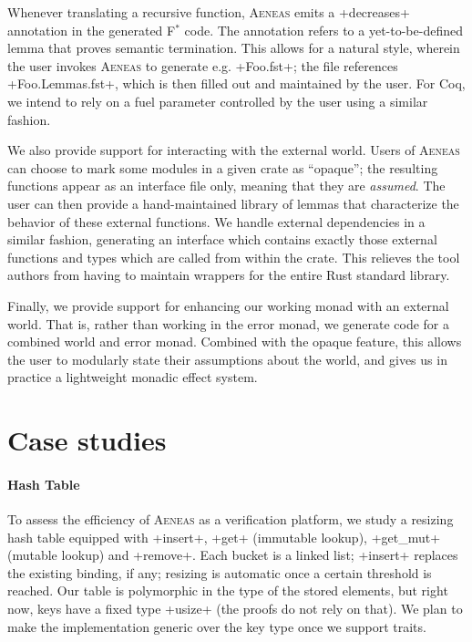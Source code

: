 \documentclass[acmsmall,screen]{acmart}
\newif\ifshort
\newcommand{\aeneas}{\textsc{Aeneas}\xspace}
\newcommand{\fstar}{F$^\ast$\xspace}
\newcommand\myparagraph[1]{\emph{#1}.\ }
\let\myparagraph\paragraph
\begin{document}
Whenever translating a recursive function, \aeneas emits a \li+decreases+
annotation in the generated \fstar code. The annotation refers to a
yet-to-be-defined lemma that proves semantic
termination. This allows for a natural style, wherein the user invokes \aeneas
to generate e.g.  \li+Foo.fst+; the file references \li+Foo.Lemmas.fst+, which
is then filled out and maintained by the user. For Coq, we intend to rely on a
fuel parameter controlled by the user using a similar fashion.

We also provide support for interacting with the external world. Users of
\aeneas can choose to mark some modules in a given crate as ``opaque''; the
resulting functions appear as an interface file
only, meaning that they are \emph{assumed}. The user can then provide a
hand-maintained library of lemmas that characterize the behavior of these
external functions. We handle external dependencies in a similar fashion,
generating an interface which contains exactly those external functions and types
which are called from within the crate. This relieves the tool authors from having to maintain
wrappers for the entire Rust standard library.

Finally, we provide support for enhancing our working monad with an
external world. That is, rather than working in the error monad, we generate
code for a combined world and error monad. Combined with the opaque feature,
this allows the user to modularly state their assumptions about the world, and
gives us in practice a lightweight monadic effect system.


\section{Case studies}
\label{sec:evaluation}

\myparagraph{Hash Table}\label{section:hashtable}
To assess the efficiency of \aeneas as a verification platform, we study a
resizing hash table equipped with
\li+insert+, \li+get+ (immutable lookup), \li+get_mut+ (mutable lookup) and \li+remove+.
Each bucket is a linked list; \li+insert+ replaces the existing binding, if any;
resizing is automatic once a certain threshold is reached.
Our table is polymorphic in the type of the stored elements, but
right now, keys have a fixed type \li+usize+ (the proofs do not rely on
that). We plan to make the implementation generic over the key type once we
support traits.




\ifshort
We prove that our Rust hash table functionally behaves like a map. Most of the
challenges revolve around resizing after the threshold has been reached,
which involves reasoning about arithmetic overflow, mutable borrows for each
given slot, and element moves to avoid copies. We establish several invariants
about buckets and entries, then alternate between a semi-structural view (a
list of lists) and a high-level view (an associative list). Our insertion lemma
is as follows:
\fi
\end{document}
